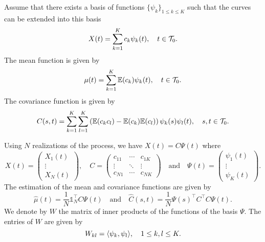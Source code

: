 Assume that there exists a basis of functions $\{\psi_k\}_{1 \leq k \leq K}$ such that the curves can be extended into this basis
\begin{equation}
X(t) = \sum_{k = 1}^{K} c_k\psi_k(t), \quad t \in \mathcal{T}_{0}.
\end{equation} 
The mean function is given by
\begin{equation}
    \mu(t) = \sum_{k = 1}^{K} \mathbb{E}(c_k)\psi_k(t), \quad t \in \mathcal{T}_{0}.
\end{equation}
The covariance function is given by
\begin{equation}
    C(s, t) = \sum_{k = 1}^{K} \sum_{l = 1}^{K} \left(\mathbb{E}(c_k c_l) - \mathbb{E}(c_k)\mathbb{E}(c_l)\right)\psi_k(s)\psi_l(t), \quad s, t \in \mathcal{T}_{0}.
\end{equation}

Using $N$ realizations of the process, we have $X(t) = C\Psi(t)$ where
\begin{equation}
    X(t) = \begin{pmatrix}
                X_1(t) \\
                \vdots \\
                X_N(t)
            \end{pmatrix}, \quad
    C = \begin{pmatrix}
            c_{11} & \cdots & c_{1K} \\
            \vdots & \ddots & \vdots \\
            c_{N1} & \cdots & c_{NK}
        \end{pmatrix} \quad\text{and}\quad
    \Psi(t) = \begin{pmatrix}
                \psi_1(t) \\
                \vdots \\
                \psi_K(t)
            \end{pmatrix}.
\end{equation}
The estimation of the mean and covariance functions are given by
\begin{equation}
    \widehat{\mu}(t) = \frac{1}{N}\mathds{1}_N^\top C\Psi(t) \quad\text{and}\quad \widehat{C}(s, t) = \frac{1}{N}\Psi(s)^\top C^\top C \Psi(t).
\end{equation}
We denote by $W$ the matrix of inner products of the functions of the basis $\Psi$. The entries of $W$ are given by
\begin{equation}
    W_{kl} = \langle\psi_k, \psi_l\rangle, \quad 1 \leq k, l \leq K.
\end{equation}

